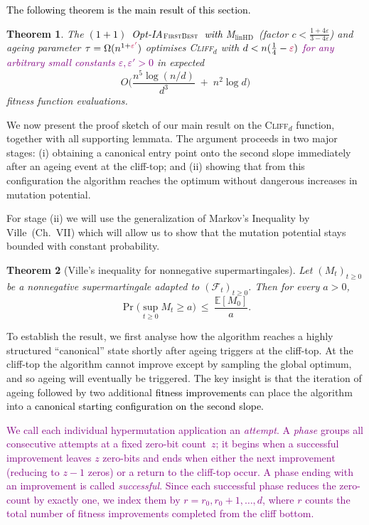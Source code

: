 \documentclass[lettersize,journal]{IEEEtran}
\newcommand{\rerev}[1]{\textcolor{purple}{#1}}
\newcommand{\rev}[1]{\textcolor{black}{#1}}
\newcommand{\EE}{\mathbb{E}}
\newcommand{\cliff}{\textsc{Cliff}$_d$}
\newcommand{\linHD}{M$_{\text{linHD}}$}
\newcommand{\firstBest}{$(1+1)$~Opt-IA$_{\textsc{FirstBest}}$}
\newtheorem{theorem}{Theorem}
\begin{document}
 
{
\rev{The following theorem is the main result of this section.}
\begin{theorem}\label{th:expoHD-cliff}
	The \textcolor{black}{\firstBest~with} \linHD\ (factor $c<\tfrac{1+4\varepsilon}{3-4\varepsilon}$) and ageing parameter $\tau=\Omega(n^{1+\rerev{\varepsilon'}})$
	optimises \cliff{} with $d<n(\tfrac{1}{4}-\rerev{\varepsilon})$ \rerev{for any arbitrary small constants $\varepsilon,\varepsilon'>0$} in expected
	\[
	O\!\Big(\frac{n^{5}\log(n/d)}{d^{3}} \;+\; n^{2}\log d\Big)
	\]
	fitness function evaluations.
\end{theorem}


We now present the proof sketch of our main result on the  \cliff{} function, together with 
all supporting lemmata.  The argument proceeds in two 
major stages: (i) obtaining a canonical entry point onto the second slope 
immediately after an ageing event at the cliff-top; and (ii) showing that from 
this configuration the algorithm reaches the optimum without dangerous increases in mutation potential.

For stage (ii) we will use the generalization of Markov's Inequality by Ville~\cite{Doob1953}(Ch.~VII) which will allow us to show that the mutation potential stays bounded with constant probability.
\begin{theorem}[Ville's inequality for nonnegative supermartingales]\label{thm:ville}
	Let $(M_t)_{t\ge 0}$ be a nonnegative supermartingale adapted to $(\mathcal F_t)_{t\ge 0}$. 
	Then for every $a>0$,
	\[
	\Pr\!\big(\sup_{t\ge 0} M_t \ge a\big)\ \le\ \frac{\EE[M_0]}{a}.
	\]
\end{theorem}



To establish the result, we first analyse how the algorithm reaches a highly 
structured ``canonical'' state shortly after ageing triggers at the cliff-top.
At the cliff-top the algorithm cannot improve except by sampling the global 
optimum, and so ageing will eventually be triggered.  The key insight is that 
the iteration of ageing followed by two additional \textcolor{black}{fitness improvements} can place the 
algorithm into a
\textcolor{black}{canonical
starting configuration on the second slope.}

\rerev{We call each individual hypermutation application an \emph{attempt}.
A \emph{phase} groups all consecutive attempts at a fixed zero-bit count~$z$;
it begins when a successful improvement leaves $z$ zero-bits and ends when
either the next improvement (reducing to $z-1$ zeros) or a
return to the cliff-top occur.
A phase ending with an improvement is called \emph{successful}.
Since each successful phase reduces the zero-count by exactly one, we
index them by $r = r_0, r_0+1, \dots, d$, where $r$ counts the total
number of fitness improvements completed from the cliff bottom.}

}
\end{document}
